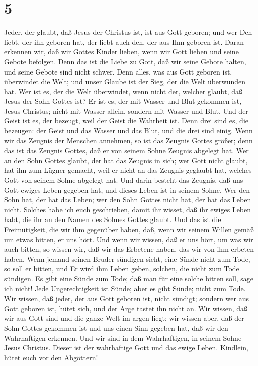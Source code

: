 \hypertarget{section-4}{%
\section{5}\label{section-4}}

 Jeder, der glaubt, daß Jesus der Christus ist, ist aus
Gott geboren; und wer Den liebt, der ihn geboren hat, der liebt auch
den, der aus Ihm geboren ist.  Daran erkennen wir, daß wir
Gottes Kinder lieben, wenn wir Gott lieben und seine Gebote befolgen.
 Denn das ist die Liebe zu Gott, daß wir seine Gebote
halten, und seine Gebote sind nicht schwer.  Denn alles,
was aus Gott geboren ist, überwindet die Welt; und unser Glaube ist der
Sieg, der die Welt überwunden hat.  Wer ist es, der die
Welt überwindet, wenn nicht der, welcher glaubt, daß Jesus der Sohn
Gottes ist?  Er ist es, der mit Wasser und Blut gekommen
ist, Jesus Christus; nicht mit Wasser allein, sondern mit Wasser und
Blut.  Und der Geist ist es, der bezeugt, weil der Geist
die Wahrheit ist.  Denn drei sind es, die bezeugen: der
Geist und das Wasser und das Blut, und die drei sind einig.
 Wenn wir das Zeugnis der Menschen annehmen, so ist das
Zeugnis Gottes größer; denn das ist das Zeugnis Gottes, daß er von
seinem Sohne Zeugnis abgelegt hat.  Wer an den Sohn
Gottes glaubt, der hat das Zeugnis in sich; wer Gott nicht glaubt, hat
ihn zum Lügner gemacht, weil er nicht an das Zeugnis geglaubt hat,
welches Gott von seinem Sohne abgelegt hat.  Und darin
besteht das Zeugnis, daß uns Gott ewiges Leben gegeben hat, und dieses
Leben ist in seinem Sohne.  Wer den Sohn hat, der hat das
Leben; wer den Sohn Gottes nicht hat, der hat das Leben nicht.
 Solches habe ich euch geschrieben, damit ihr wisset, daß
ihr ewiges Leben habt, die ihr an den Namen des Sohnes Gottes glaubt.
 Und das ist die Freimütigkeit, die wir ihm gegenüber
haben, daß, wenn wir seinem Willen gemäß um etwas bitten, er uns hört.
 Und wenn wir wissen, daß er uns hört, um was wir auch
bitten, so wissen wir, daß wir das Erbetene haben, das wir von ihm
erbeten haben.  Wenn jemand seinen Bruder sündigen sieht,
eine Sünde nicht zum Tode, so soll er bitten, und Er wird ihm Leben
geben, solchen, die nicht zum Tode sündigen. Es gibt eine Sünde zum
Tode; daß man für eine solche bitten soll, sage ich nicht!
 Jede Ungerechtigkeit ist Sünde; aber es gibt Sünde;
nicht zum Tode.  Wir wissen, daß jeder, der aus Gott
geboren ist, nicht sündigt; sondern wer aus Gott geboren ist, hütet
sich, und der Arge tastet ihn nicht an.  Wir wissen, daß
wir aus Gott sind und die ganze Welt im argen liegt;  wir
wissen aber, daß der Sohn Gottes gekommen ist und uns einen Sinn gegeben
hat, daß wir den Wahrhaftigen erkennen. Und wir sind in dem
Wahrhaftigen, in seinem Sohne Jesus Christus. Dieser ist der wahrhaftige
Gott und das ewige Leben.  Kindlein, hütet euch vor den
Abgöttern!
